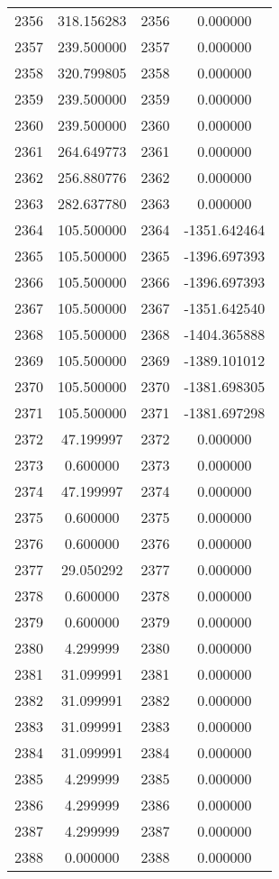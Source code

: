 \documentclass[12pt]{article}
\begin{document}
\begin{longtable}{@{}cccc@{}}
2356 & 318.156283 & 2356 & 0.000000 \\
2357 & 239.500000 & 2357 & 0.000000 \\
2358 & 320.799805 & 2358 & 0.000000 \\
2359 & 239.500000 & 2359 & 0.000000 \\
2360 & 239.500000 & 2360 & 0.000000 \\
2361 & 264.649773 & 2361 & 0.000000 \\
2362 & 256.880776 & 2362 & 0.000000 \\
2363 & 282.637780 & 2363 & 0.000000 \\
2364 & 105.500000 & 2364 & -1351.642464 \\
2365 & 105.500000 & 2365 & -1396.697393 \\
2366 & 105.500000 & 2366 & -1396.697393 \\
2367 & 105.500000 & 2367 & -1351.642540 \\
2368 & 105.500000 & 2368 & -1404.365888 \\
2369 & 105.500000 & 2369 & -1389.101012 \\
2370 & 105.500000 & 2370 & -1381.698305 \\
2371 & 105.500000 & 2371 & -1381.697298 \\
2372 & 47.199997 & 2372 & 0.000000 \\
2373 & 0.600000 & 2373 & 0.000000 \\
2374 & 47.199997 & 2374 & 0.000000 \\
2375 & 0.600000 & 2375 & 0.000000 \\
2376 & 0.600000 & 2376 & 0.000000 \\
2377 & 29.050292 & 2377 & 0.000000 \\
2378 & 0.600000 & 2378 & 0.000000 \\
2379 & 0.600000 & 2379 & 0.000000 \\
2380 & 4.299999 & 2380 & 0.000000 \\
2381 & 31.099991 & 2381 & 0.000000 \\
2382 & 31.099991 & 2382 & 0.000000 \\
2383 & 31.099991 & 2383 & 0.000000 \\
2384 & 31.099991 & 2384 & 0.000000 \\
2385 & 4.299999 & 2385 & 0.000000 \\
2386 & 4.299999 & 2386 & 0.000000 \\
2387 & 4.299999 & 2387 & 0.000000 \\
2388 & 0.000000 & 2388 & 0.000000 \\

\end{longtable}
\end{document}
